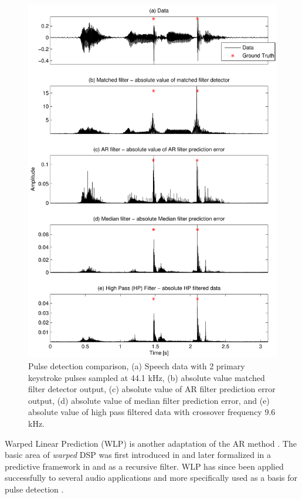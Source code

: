 \begin{figure}[!] %
\centering
\includegraphics[width=130mm]{LitRev_DetectCompare2.pdf}
\caption{Pulse detection comparison, (a) Speech data with 2 primary keystroke pulses sampled at 44.1 kHz, (b) absolute value matched filter detector output, (c) absolute value of AR filter prediction error output, (d) absolute value of median filter prediction error, and (e) absolute value of high pass filtered data with crossover frequency 9.6 kHz.}
\label{fig:LitRev_DetectCompare2}
\end{figure}

Warped Linear Prediction (WLP) is another adaptation of the AR method \cite{Esquef2002}. The basic area of \emph{warped} DSP was first introduced in \cite{Oppenheim1983} and later formalized in a predictive framework in \cite{Strube1980} and as a recursive filter\cite{Steiglitz1980}. WLP has since been applied successfully to several audio applications \cite{Karjalainen1997}\cite{Haermae2000} and more specifically used as a basis for pulse detection \cite{Esquef2000}\cite{Esquef2002}.

